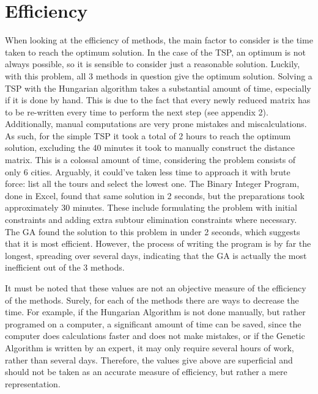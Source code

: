 \section{Efficiency}	
	
When looking at the efficiency of methods, the main factor to consider is the time taken to reach the optimum solution. In the case of the TSP, an optimum is not always possible, so it is sensible to consider just a reasonable solution. Luckily, with this problem, all 3 methods in question give the optimum solution.
\vspace{5mm}
Solving a TSP with the Hungarian algorithm takes a substantial amount of time, especially if it is done by hand. This is due to the fact that every newly reduced matrix has to be re-written every time to perform the next step (see appendix 2). Additionally, manual computations are very prone mistakes and miscalculations. As such, for the simple TSP it took a total of 2 hours to reach the optimum solution, excluding the 40 minutes it took to manually construct the distance matrix. This is a colossal amount of time, considering the problem consists of only 6 cities. Arguably, it could’ve taken less time to approach it with brute force: list all the tours and select the lowest one.
\vspace{5mm}
The Binary Integer Program, done in Excel, found that same solution in 2 seconds, but the preparations took approximately 30 minutes. These include formulating the problem with initial constraints and adding extra subtour elimination constraints where necessary.
\vspace{5mm}
The GA found the solution to this problem in under 2 seconds, which suggests that it is most efficient. However, the process of writing the program is by far the longest, spreading over several days, indicating that the GA is actually the most inefficient out of the 3 methods.

\vspace{5mm}

It must be noted that these values are not an objective measure of the efficiency of the methods. Surely, for each of the methods there are ways to decrease the time. For example, if the Hungarian Algorithm is not done manually, but rather programed on a computer, a significant amount of time can be saved, since the computer does calculations faster and does not make mistakes, or if the Genetic Algorithm is written by an expert, it may only require several hours of work, rather than several days. Therefore, the values give above are superficial and should not be taken as an accurate measure of efficiency, but rather a mere representation.

